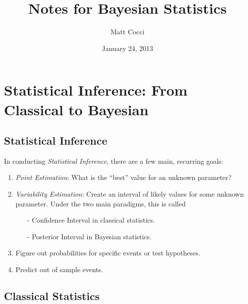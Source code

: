 \documentclass[12pt]{article}
\author{Matt Cocci}
\title{Notes for Bayesian Statistics}
\date{January 24, 2013}
\begin{document}
\maketitle

\tableofcontents

\newpage
\section{Statistical Inference: From Classical to Bayesian}

\subsection{Statistical Inference}
In conducting \emph{Statistical Inference}, there are a few
main, recurring goals:
\begin{enumerate}
   \item{\emph{Point Estimation}: What is the ``best'' value
      for an unknown parameter?}
   \item{\emph{Variability Estimation}: Create an interval of
      likely values for some unknown parameter. Under the two
      main paradigms, this is called
      \begin{itemize}
	 \item[-]{Confidence Interval in classical statistics.}
	 \item[-]{Posterior Interval in Bayesian statistics.}
      \end{itemize}
   }
   \item{Figure out probabilities for specific events or
      test hypotheses.}
   \item{Predict out of sample events.}
\end{enumerate}

\subsection{Classical Statistics}
\end{document}

